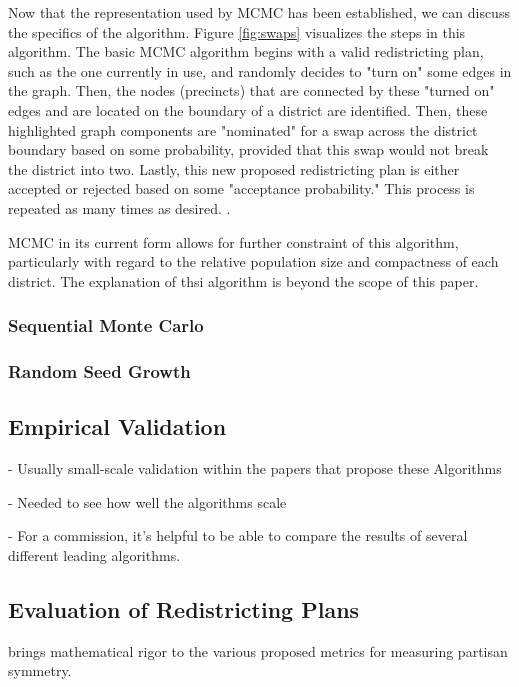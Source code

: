 Now that the representation used by MCMC has been established, we can discuss the specifics of the algorithm. Figure \ref{fig:swaps} visualizes the steps in this algorithm. The basic MCMC algorithm begins with a valid redistricting plan, such as the one currently in use, and randomly decides to "turn on" some edges in the graph. Then, the nodes (precincts) that are connected by these "turned on" edges and are located on the boundary of a district are identified. Then, these highlighted graph components are "nominated" for a swap across the district boundary based on some probability, provided that this swap would not break the district into two. Lastly, this new proposed redistricting plan is either accepted or rejected based on some "acceptance probability." This process is repeated as many times as desired. \parencite{fifield2020}.

MCMC in its current form allows for further constraint of this algorithm, particularly with regard to the relative population size and compactness of each district. \parencite[6]{fifield2020} The explanation of thsi algorithm is beyond the scope of this paper. 

\subsubsection{Sequential Monte Carlo}

\subsubsection{Random Seed Growth}

\subsection{Empirical Validation}

- Usually small-scale validation within the papers that propose these Algorithms

- Needed to see how well the algorithms scale

- For a commission, it's helpful to be able to compare the results of several different leading algorithms. 

\subsection{Evaluation of Redistricting Plans}

\textcite{katz2020} brings mathematical rigor to the various proposed metrics for measuring partisan symmetry. 

